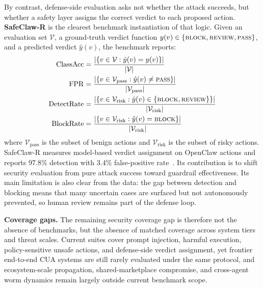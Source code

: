 By contrast, defense-side evaluation asks not whether the attack succeeds, but whether a safety layer assigns the correct verdict to each proposed action. \textbf{SafeClaw-R} is the clearest benchmark instantiation of that logic. Given an evaluation set $\mathcal{V}$, a ground-truth verdict function $y(v) \in \{\textsc{block}, \textsc{review}, \textsc{pass}\}$, and a predicted verdict $\hat{y}(v)$, the benchmark reports:
\begin{align}
\mathrm{ClassAcc} &= \frac{|\{v \in \mathcal{V} : \hat{y}(v) = y(v)\}|}{|\mathcal{V}|} \label{eq:classacc} \\
\mathrm{FPR} &= \frac{|\{v \in \mathcal{V}_{\mathrm{pass}} : \hat{y}(v) \neq \textsc{pass}\}|}{|\mathcal{V}_{\mathrm{pass}}|} \label{eq:fpr} \\
\mathrm{DetectRate} &= \frac{|\{v \in \mathcal{V}_{\mathrm{risk}} : \hat{y}(v) \in \{\textsc{block}, \textsc{review}\}\}|}{|\mathcal{V}_{\mathrm{risk}}|} \label{eq:detectrate} \\
\mathrm{BlockRate} &= \frac{|\{v \in \mathcal{V}_{\mathrm{risk}} : \hat{y}(v) = \textsc{block}\}|}{|\mathcal{V}_{\mathrm{risk}}|} \label{eq:blockrate}
\end{align}
where $\mathcal{V}_{\mathrm{pass}}$ is the subset of benign actions and $\mathcal{V}_{\mathrm{risk}}$ is the subset of risky actions. SafeClaw-R measures model-based verdict assignment on OpenClaw actions and reports 97.8\% detection with 3.4\% false-positive rate~\cite{safeclawr2026}. Its contribution is to shift security evaluation from pure attack success toward guardrail effectiveness. Its main limitation is also clear from the data: the gap between detection and blocking means that many uncertain cases are surfaced but not autonomously prevented, so human review remains part of the defense loop.

\textbf{Coverage gaps.} The remaining security coverage gap is therefore not the absence of benchmarks, but the absence of matched coverage across system tiers and threat scales. Current suites cover prompt injection, harmful execution, policy-sensitive unsafe actions, and defense-side verdict assignment, yet frontier end-to-end CUA systems are still rarely evaluated under the same protocol, and ecosystem-scale propagation, shared-marketplace compromise, and cross-agent worm dynamics remain largely outside current benchmark scope.


